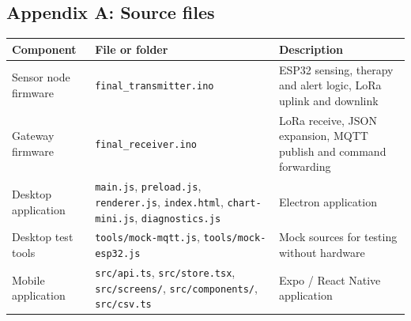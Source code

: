 \subsection*{Appendix A: Source files}
{\small{}
\begin{table}[H]
\centering
\begin{tabularx}{\textwidth}{@{}>{\raggedright\arraybackslash}p{3.2cm}>{\raggedright\arraybackslash}p{5.3cm}X@{}}
\toprule
\textbf{Component} & \textbf{File or folder} & \textbf{Description}\\
\midrule
Sensor node firmware & \texttt{final\_transmitter.ino} & ESP32 sensing, therapy and alert logic, LoRa uplink and downlink\\
Gateway firmware & \texttt{final\_receiver.ino} & LoRa receive, JSON expansion, MQTT publish and command forwarding\\
Desktop application & \texttt{main.js}, \texttt{preload.js}, \texttt{renderer.js}, \texttt{index.html}, \texttt{chart-mini.js}, \texttt{diagnostics.js} & Electron application\\
Desktop test tools & \texttt{tools/mock-mqtt.js}, \texttt{tools/mock-esp32.js} & Mock sources for testing without hardware\\
Mobile application & \texttt{src/api.ts}, \texttt{src/store.tsx}, \texttt{src/screens/}, \texttt{src/components/}, \texttt{src/csv.ts} & Expo / React Native application\\
\bottomrule
\end{tabularx}
\end{table}}

